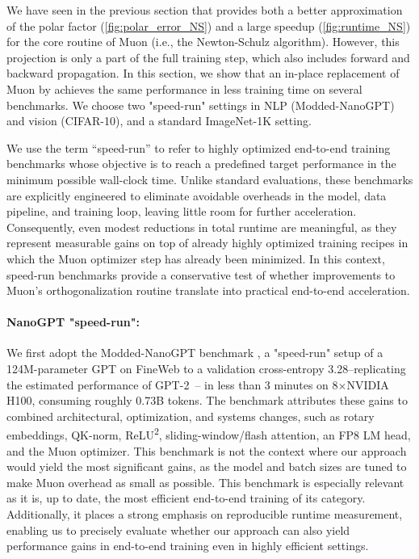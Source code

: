 We have seen in the previous section that  \turbomuon provides both a better approximation of the polar factor (\cref{fig:polar_error_NS})  and a large speedup (\cref{fig:runtime_NS}) for the core routine of Muon (i.e., the Newton-Schulz algorithm). However, this projection is only a part of the full training step, which also includes forward and backward propagation. In this section, we show that an in-place replacement of Muon by \turbomuon achieves the same performance in less training time on several benchmarks. We choose two "speed-run" settings in NLP (Modded-NanoGPT) and vision (CIFAR-10), and a standard ImageNet-1K setting.

We use the term “speed-run” to refer to highly optimized end-to-end training benchmarks whose objective is to reach a predefined target performance in the minimum possible wall-clock time. Unlike standard evaluations, these benchmarks are explicitly engineered to eliminate avoidable overheads in the model, data pipeline, and training loop, leaving little room for further acceleration. Consequently, even modest reductions in total runtime are meaningful, as they represent measurable gains on top of already highly optimized training recipes in which the Muon optimizer step has already been minimized. In this context, speed-run benchmarks provide a conservative test of whether improvements to Muon’s orthogonalization routine translate into practical end-to-end acceleration.

\iffalse
\paragraph{NanoGPT "speed-run":} 

We first adopt the Modded-NanoGPT benchmark \cite{modded_nanogpt_2024}, a "speed-run" setup of a 124M-parameter GPT on FineWeb to a validation cross-entropy 3.28--replicating the estimated performance of GPT-2~\cite{radford2019language}-- in less than 3 minutes on 8×NVIDIA H100, consuming roughly 0.73B tokens. The benchmark attributes these gains to combined architectural, optimization, and systems changes, such as rotary embeddings, QK-norm, ReLU\textsuperscript{2}, sliding-window/flash attention, an FP8 LM head, and the Muon optimizer. This benchmark is not the context where our approach would yield the most significant gains, as the model and batch sizes are tuned to make Muon overhead as small as possible. This benchmark is especially relevant as it is, up to date, the most efficient end-to-end training of its category. Additionally, it places a strong emphasis on reproducible runtime measurement, enabling us to precisely evaluate whether our approach can also yield performance gains in end-to-end training even in highly efficient settings.

